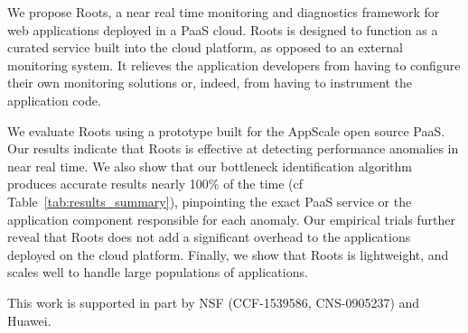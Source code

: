 We propose Roots, a near real time monitoring and diagnostics
framework for web applications deployed in a PaaS cloud. 
Roots is designed to function as a curated service
built into the cloud platform, as opposed to an external monitoring system. 
It relieves the application developers from having to configure
their own monitoring solutions or, indeed,
from having to instrument the application code.


We evaluate Roots using a prototype built for the AppScale open source PaaS. 
Our results indicate that Roots is effective at detecting performance anomalies
in near real time. We also show that our bottleneck identification algorithm
produces accurate results nearly 100\% of the time (cf
Table~\ref{tab:results_summary}), pinpointing the exact PaaS
service or the application component responsible for each anomaly. Our empirical trials further 
reveal that Roots does not add a significant overhead to the applications deployed
on the cloud platform. Finally, we show that Roots is lightweight, 
and scales well to handle large populations of applications. 


\vspace{0.1in}
\noindent
This work is supported in part by NSF (CCF-1539586, CNS-0905237) and Huawei.
